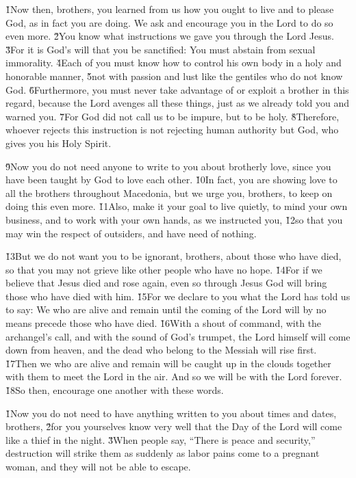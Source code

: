 \v{1}Now then, brothers, you learned from us how you ought to live and to please God, as in fact you are doing. We ask and encourage you in the Lord to do so even more. \v{2}You know what instructions we gave you through the Lord Jesus. \v{3}For it is God's will that you be sanctified: You must abstain from sexual immorality. \v{4}Each of you must know how to control his own body in a holy and honorable manner, \v{5}not with passion and lust like the gentiles who do not know God. \v{6}Furthermore, you must never take advantage of or exploit a brother in this regard, because the Lord avenges all these things, just as we already told you and warned you. \v{7}For God did not call us to be impure, but to be holy. \v{8}Therefore, whoever rejects this instruction is not rejecting human authority but God, who gives you his Holy Spirit.

\v{9}Now you do not need anyone to write to you about brotherly love, since you have been taught by God to love each other. \v{10}In fact, you are showing love to all the brothers throughout Macedonia, but we urge you, brothers, to keep on doing this even more. \v{11}Also, make it your goal to live quietly, to mind your own business, and to work with your own hands, as we instructed you, \v{12}so that you may win the respect of outsiders, and have need of nothing.

\v{13}But we do not want you to be ignorant, brothers, about those who have died, so that you may not grieve like other people who have no hope. \v{14}For if we believe that Jesus died and rose again, even so through Jesus God will bring those who have died with him. \v{15}For we declare to you what the Lord has told us to say: We who are alive and remain until the coming of the Lord will by no means precede those who have died. \v{16}With a shout of command, with the archangel's call, and with the sound of God's trumpet, the Lord himself will come down from heaven, and the dead who belong to the Messiah will rise first. \v{17}Then we who are alive and remain will be caught up in the clouds together with them to meet the Lord in the air. And so we will be with the Lord forever. \v{18}So then, encourage one another with these words.

\v{1}Now you do not need to have anything written to you about times and dates, brothers, \v{2}for you yourselves know very well that the Day of the Lord will come like a thief in the night. \v{3}When people say, ``There is peace and security,'' destruction will strike them as suddenly as labor pains come to a pregnant woman, and they will not be able to escape.


